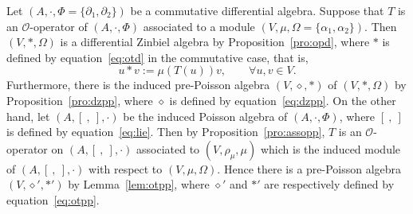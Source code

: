 \documentclass[10pt,a4paper]{amsart}
\numberwithin{equation}{section}
\begin{document}
Let $(A, \cdot, \Phi = \{\partial_1, \partial_2\})$ be a commutative differential algebra.
Suppose that $T$ is an $\mathcal{O}$-operator of $(A, \cdot, \Phi)$ associated to a module $(V, \mu, \Omega = \{\alpha_1, \alpha_2\})$.
Then $(V, \ast, \Omega)$ is a differential Zinbiel algebra by Proposition~\ref{pro:opd}, where $\ast$ is defined by equation~\eqref{eq:otd} in the commutative case, that is,
\begin{equation}
 u \ast v := \mu(T(u)) v, \qquad \forall u,v \in V. \label{eq:Zin11}
\end{equation}
Furthermore, there is the induced pre-Poisson algebra $(V,
\diamond, \ast)$ of $(V, \ast, \Omega)$ by
Proposition~\ref{pro:dzpp}, where $\diamond$ is defined by
equation~\eqref{eq:dzpp}. On the other hand, let $(A, [\ ,\ ], \cdot)$
be the induced Poisson algebra of $(A, \cdot, \Phi)$, where $[\ ,\
]$ is defined by equation~\eqref{eq:lie}. Then by
Proposition~\ref{pro:assopp}, $T$ is an $\mathcal O$-operator on
$(A, [\ ,\ ], \cdot)$ associated to $(V, \rho_\mu, \mu)$ which is
the induced module of $(A, [\ ,\ ], \cdot)$ with respect
to $(V, \mu, \Omega)$. Hence there is a pre-Poisson algebra $(V,
\diamond', \ast')$ by Lemma~\ref{lem:otpp}, where $\diamond'$ and
$\ast'$ are respectively defined by equation~\eqref{eq:otpp}.
\end{document}
